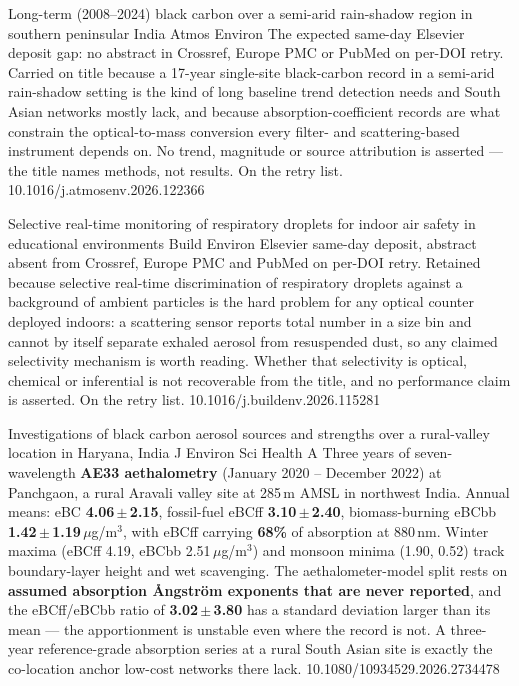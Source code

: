 \documentclass[10pt]{article}
\begin{document}
{Long-term (2008--2024) black carbon over a semi-arid rain-shadow region in southern
peninsular India}
{Atmos Environ}
{The expected same-day Elsevier deposit gap: no abstract in Crossref, Europe PMC or
PubMed on per-DOI retry. Carried on title because a 17-year single-site black-carbon
record in a semi-arid rain-shadow setting is the kind of long baseline trend detection
needs and South Asian networks mostly lack, and because absorption-coefficient records
are what constrain the optical-to-mass conversion every filter- and scattering-based
instrument depends on. No trend, magnitude or source attribution is asserted --- the title
names methods, not results. On the retry list.}
{10.1016/j.atmosenv.2026.122366}

{Selective real-time monitoring of respiratory droplets for indoor air safety in
educational environments}
{Build Environ}
{Elsevier same-day deposit, abstract absent from Crossref, Europe PMC and PubMed on
per-DOI retry. Retained because selective real-time discrimination of respiratory
droplets against a background of ambient particles is the hard problem for any optical
counter deployed indoors: a scattering sensor reports total number in a size bin and
cannot by itself separate exhaled aerosol from resuspended dust, so any claimed
selectivity mechanism is worth reading. Whether that selectivity is optical, chemical or
inferential is not recoverable from the title, and no performance claim is asserted.
On the retry list.}
{10.1016/j.buildenv.2026.115281}

{Investigations of black carbon aerosol sources and strengths over a rural-valley location
in Haryana, India}
{J Environ Sci Health A}
{Three years of seven-wavelength \textbf{AE33 aethalometry} (January 2020 -- December 2022)
at Panchgaon, a rural Aravali valley site at 285\,m AMSL in northwest India. Annual means:
eBC \textbf{4.06\,$\pm$\,2.15}, fossil-fuel eBCff \textbf{3.10\,$\pm$\,2.40}, biomass-burning
eBCbb \textbf{1.42\,$\pm$\,1.19}\,$\mu$g/m$^3$, with eBCff carrying \textbf{68\%} of
absorption at 880\,nm. Winter maxima (eBCff 4.19, eBCbb 2.51\,$\mu$g/m$^3$) and monsoon
minima (1.90, 0.52) track boundary-layer height and wet scavenging. The aethalometer-model
split rests on \textbf{assumed absorption \AA ngstr\"om exponents that are never reported},
and the eBCff/eBCbb ratio of \textbf{3.02\,$\pm$\,3.80} has a standard deviation larger
than its mean --- the apportionment is unstable even where the record is not. A three-year
reference-grade absorption series at a rural South Asian site is exactly the co-location
anchor low-cost networks there lack.}
{10.1080/10934529.2026.2734478}
\end{document}

